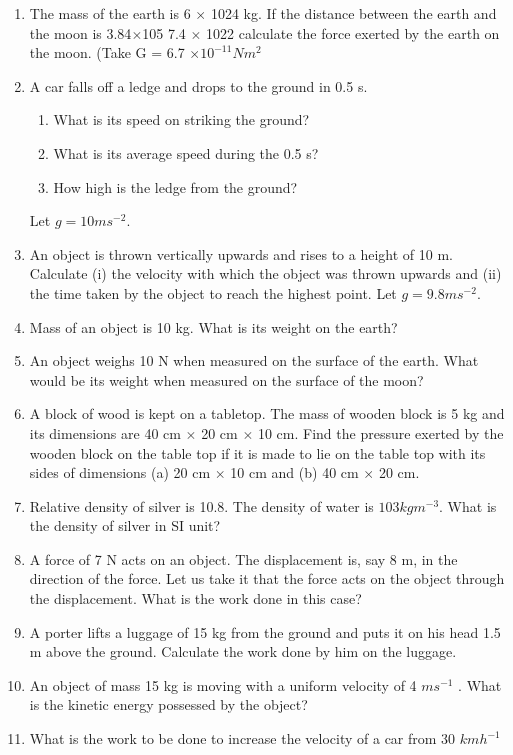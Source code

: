 \begin{enumerate}[label=\arabic*.,ref=\thesection.\theenumi]
\item  The mass of the earth is 6 $\times$ 1024
kg. If the distance between the earth and the moon is 3.84$\times$105
7.4 $\times$ 1022
calculate the force exerted by the earth on the moon. (Take G = 6.7 $\times 10^{-11}
N m^2$ 
\item  A car falls off a ledge and drops to the ground in 0.5 s. 
\begin{enumerate}
\item   What is its speed on striking the ground?
\item   What is its average speed during the 0.5 s?
\item   How high is the ledge from the ground?
\end{enumerate}
Let $g = 10 m s^{-2}$.
\item  An object is thrown vertically upwards and rises to a height of 10 m. Calculate (i) the velocity with which the object was thrown upwards and (ii) the time taken by the object to reach the highest point. Let $g = 9.8 m s^{-2}$.
\item  Mass of an object is 10 kg. What is its weight on the earth?
\item  An object weighs 10 N when measured on the surface of the earth. What would be its weight when measured on the surface of the moon?
\item  A block of wood is kept on a tabletop. The mass of wooden block is 5 kg and its dimensions are 40 cm $\times$ 20 cm $\times$ 10 cm. Find the pressure exerted by the wooden block on the table top if it is made to lie on the table top with its sides of dimensions (a) 20 cm $\times$ 10 cm and (b) 40 cm $\times$ 20 cm.
\item  Relative density of silver is 10.8. The density of water is $103
kg m^{-3}$.  What is the density of silver in SI unit? 
\item  A force of 7 N acts on an object. The displacement is, say 8 m, in the direction of the force. Let us take it that the force acts on the object through the displacement. What is the work done in this case?
\item  A porter lifts a luggage of 15 kg from the ground and puts it on his head 1.5 m above the ground. Calculate the work done by him on the luggage.
\item  An object of mass 15 kg is moving with a uniform velocity of 4
$m s^{-1}$ 
. What is the kinetic energy possessed by the object?
\item  What is the work to be done to increase the velocity of a car from 30 $km h^{-1}$

\end{enumerate}
